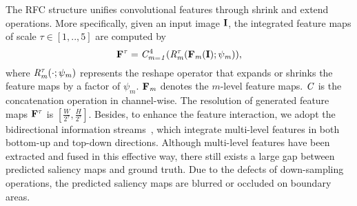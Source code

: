 \documentclass[journal]{IEEEtran}
\begin{document}
%
The RFC structure unifies convolutional features through shrink and extend operations.
%
More specifically, given an input image $\bf{I}$, the integrated feature maps of scale $\tau\in[1,..,5]$ are computed by
\begin{equation}
\bf{F}^{\tau} = \it{C}_{m=1}^{\text{4}}( \it{R_{m}^{\tau}}(\bf{F}_{\it{m}}(I);\psi_{\it{m}})),
%
\label{eq:original-bayes}
\end{equation}
where $\it{R_{m}^{\tau}}({\cdot};\psi_{m})$ represents the reshape operator that expands or shrinks the feature maps by a factor of $\psi_{m}$.
%
$\bf{F}_{\it{m}}$ denotes the $m$-level feature maps.
$\it{C}$ is the concatenation operation in channel-wise.
%
The resolution of generated feature maps $\bf{F^{\tau}}$ is $[\frac{W}{2^{\tau}},\frac{H}{2^{\tau}}]$.
%
Besides, to enhance the feature interaction, we adopt the bidirectional information streams~\cite{Zhang2017Amulet}, which integrate multi-level features in both bottom-up and top-down directions.
%
Although multi-level features have been extracted and fused in this effective way, there still exists a large gap between predicted saliency maps and ground truth.
%
Due to the defects of down-sampling operations, the predicted saliency maps are blurred or occluded on boundary areas.
\vspace{-2mm}
\end{document}
